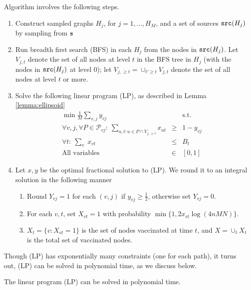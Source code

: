Algorithm \algo{} involves the following steps.
\begin{enumerate}
\item
Construct sampled graphs $H_j$, for $j=1,\ldots,H_M$, and a set of sources $\texttt{src}(H_j)$ by sampling from $\mathbf{s}$
\item
Run breadth first search (BFS) in each $H_j$ from the nodes in $\texttt{src}(H_j)$.
Let $V_{j,t}$ denote the set of all nodes at level $t$ in the BFS tree in $H_j$ 
(with the nodes in $\texttt{src}(H_j)$ at level $0$); let $V_{j,\geq t}=\cup_{t'\geq t} V_{j,t}$ denote
the set of all nodes at level $t$ or more.
\item
Solve the following linear program (LP), as described in Lemma \ref{lemma:ellipsoid}
\begin{eqnarray}
\label{eqn:obj}
\min \frac{1}{M}\sum_{v, j} y_{vj}  && \text{s.t.}\\
\label{eqn:hit-paths}
\forall v, j, \forall P \in \mathcal{P}_{vj}:\  \sum_{u,t: u\in P\cap V_{j,\geq t}} x_{ut} &\geq& 1 - y_{vj}\\
\label{eqn:Bt}
\forall t:\ \sum_{v} \; x_{vt} &\leq& B_t\\
\mbox{All variables} &\in& [0, 1]
\end{eqnarray}
\item
Let $x, y$ be the optimal fractional solution to (LP).
We round it to an integral solution in the following manner
\begin{enumerate}
\item
Round $Y_{vj} = 1$ for each $(v,j)$ if $y_{vj} \geq \frac{1}{2}$, otherwise set $Y_{vj} = 0$.
\item
For each $v, t$, set $X_{vt}=1$ with probability $\min\{1, 2 x_{vt}\log(4nMN)\}$. 
\item
$X_t=\{v: X_{vt}=1\}$ is the set of nodes vaccinated at time $t$, and $X=\cup_t X_t$
is the total set of vaccinated nodes.
\end{enumerate}
\end{enumerate}

Though (LP) has exponentially many constraints (one for each path), it turns out, (LP) can be solved
in polynomial time, as we discuss below.
\begin{lemma}
\label{lemma:ellipsoid}
The linear program (LP) can be solved in polynomial time.
\end{lemma}

